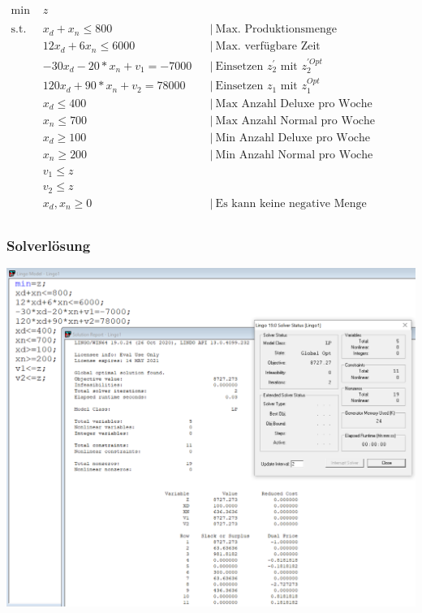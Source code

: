 \documentclass[a4paper,11pt]{article}
\begin{document}
\begin{align*}
    \text{min } &z \\~\\
    \text{s.t. } & x_{d} + x_{n} \le 800 && \big|~ \text{Max. Produktionsmenge} \\
    & 12x_{d} + 6x_{n} \le 6000 && \big|~ \text{Max. verfügbare Zeit} \\
    & -30x_{d} -20 * x_{n} + v_{1} = -7000 && \big|~ \text{Einsetzen $z_{2}^{'}$ mit $z_{2}^{'Opt}$ } \\
    & 120x_{d} + 90 * x_{n} + v_{2} = 78000 && \big|~ \text{Einsetzen $z_{1}$ mit $z_{1}^{Opt}$ } \\
    & x_{d} \le 400 && \big|~ \text{Max Anzahl Deluxe pro Woche} \\
    & x_{n} \le 700 && \big|~ \text{Max Anzahl Normal pro Woche} \\
    & x_{d} \ge 100 && \big|~ \text{Min Anzahl Deluxe pro Woche} \\
    & x_{n} \ge 200 && \big|~ \text{Min Anzahl Normal pro Woche} \\
    & v_{1} \le z &&  \text{} \\
    & v_{2} \le z && \text{} \\
    & x_{d}, x_{n} \ge 0 && \big|~ \text{Es kann keine negative Menge produziert werden} \\
\end{align*}

\subsubsection*{Solverlösung}

\includegraphics[width=1\linewidth]{src/blatt_7_aufgabe_2_solverloesung_3.png}
\end{document}
